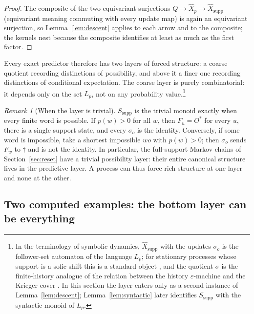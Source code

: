 \documentclass[10pt]{article}
\theoremstyle{definition}
\theoremstyle{remark}
\newtheorem{remark}[theorem]{Remark}
\newcommand{\Obs}{O}
\begin{document}
\begin{proof}
The composite of the two equivariant surjections
$Q\to\widehat X_p\to\widehat X_{\mathrm{supp}}$ (equivariant meaning
commuting with every update map) is again an equivariant surjection, so Lemma~\ref{lem:descent} applies to each arrow and to the
composite; the kernels nest because the composite identifies at least as
much as the first factor.
\end{proof}

Every exact predictor therefore has two layers of forced structure:
a coarse quotient recording distinctions of possibility, and above it
a finer one recording distinctions of conditional expectation.  The
coarse layer is purely combinatorial: it depends only on the set
$L_p$, not on any probability value.\footnote{In the terminology of symbolic
dynamics, $\widehat X_{\mathrm{supp}}$ with the updates $\sigma_o$ is
the follower-set automaton of the language $L_p$; for stationary
processes whose support is a sofic shift this is a standard object
\cite{LindMarcus1995}, and the quotient $\sigma$ is the finite-history
analogue of the relation between the history $\varepsilon$-machine and
the Krieger cover \cite{TraversCrutchfield2025}.  In this section
the layer enters only as a second instance of Lemma~\ref{lem:descent};
Lemma~\ref{lem:syntactic} later identifies $S_{\mathrm{supp}}$ with
the syntactic monoid of $L_p$.}



\begin{remark}[When the layer is trivial]
\label{rem:full-support}
$S_{\mathrm{supp}}$ is the trivial monoid exactly when every finite word
is possible.  If $p(w)>0$ for all $w$, then $F_u=\Obs^*$ for every $u$,
there is a single support state, and every $\sigma_o$ is the identity.
Conversely, if some word is impossible, take a shortest impossible $wo$
with $p(w)>0$; then $\sigma_o$ sends $F_w$ to $\dagger$ and is not the
identity.  In particular, the full-support Markov chains of
Section~\ref{sec:reset} have a trivial possibility layer: their entire
canonical structure lives in the predictive layer.  A process can thus force rich structure at one layer
and none at the other.
\end{remark}

\subsection{Two computed examples: the bottom layer can be everything}
\label{subsec:computed-support}
\end{document}
